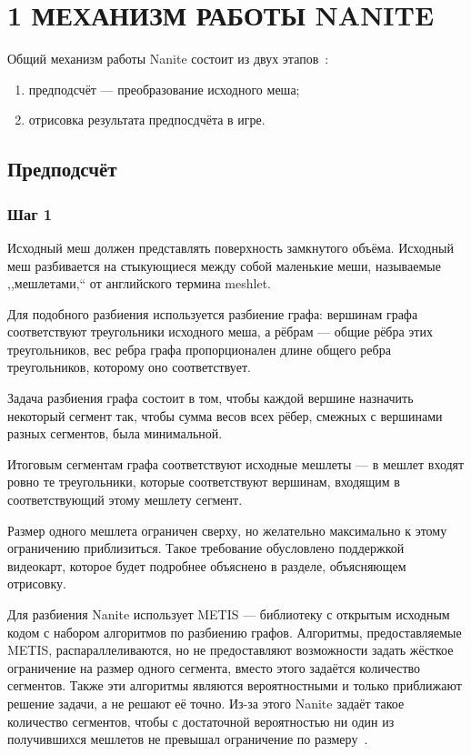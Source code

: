 \clearpage
\section{1 МЕХАНИЗМ РАБОТЫ NANITE}
Общий механизм работы Nanite состоит из двух этапов~\cite{KarisNanite}:
\begin{enumerate}
    \item предподсчёт --- преобразование исходного меша;
    \item отрисовка результата предпосдчёта в игре.
\end{enumerate}

\subsection*{Предподсчёт}
\subsubsection*{Шаг 1}
Исходный меш должен представлять поверхность замкнутого объёма.
Исходный меш разбивается на стыкующиеся между собой маленькие меши, называемые ,,мешлетами,`` от английского термина meshlet.

Для подобного разбиения используется разбиение графа: вершинам графа соответствуют треугольники исходного меша, а рёбрам --- общие рёбра этих треугольников, вес ребра графа пропорционален длине общего ребра треугольников, которому оно соответствует.

Задача разбиения графа состоит в том, чтобы каждой вершине назначить некоторый сегмент так, чтобы сумма весов всех рёбер, смежных с вершинами разных сегментов, была минимальной.

Итоговым сегментам графа соответствуют исходные мешлеты --- в мешлет входят ровно те треугольники, которые соответствуют вершинам, входящим в соответствующий этому мешлету сегмент.

Размер одного мешлета ограничен сверху, но желательно максимально к этому ограничению приблизиться.
Такое требование обусловлено поддержкой видеокарт, которое будет подробнее объяснено в разделе, объясняющем отрисовку.

Для разбиения Nanite использует METIS --- библиотеку с открытым исходным кодом с набором алгоритмов по разбиению графов.
Алгоритмы, предоставляемые METIS, распараллеливаются, но не предоставляют возможности задать жёсткое ограничение на размер одного сегмента, вместо этого задаётся количество сегментов.
Также эти алгоритмы являются вероятностными и только приближают решение задачи, а не решают её точно.
Из-за этого Nanite задаёт такое количество сегментов, чтобы с достаточной вероятностью ни один из получившихся мешлетов не превышал ограничение по размеру~\cite{NaniteSrcMETIS}.

